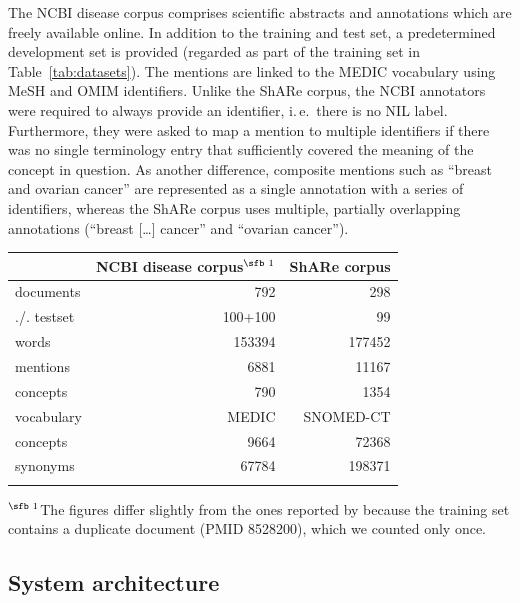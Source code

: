 \documentclass{bioinfo}
\newcommand{\ie}{i.\,e.\ }
\begin{document}
The NCBI disease corpus comprises scientific abstracts and annotations which are freely available online.
In addition to the training and test set, a predetermined development set is provided (regarded as part of the training set in Table~\ref{tab:datasets}).
The mentions are linked to the MEDIC vocabulary \citep{davis-et-al:2012}
using MeSH  %
and OMIM  %
identifiers.
Unlike the ShARe corpus, the NCBI annotators were required to always provide an identifier, \ie there is no NIL label.
Furthermore, they were asked to map a mention to multiple identifiers if there was no single terminology entry that sufficiently covered the meaning of the concept in question.
As another difference, composite mentions such as “breast and ovarian cancer” are represented as a single annotation with a series of identifiers, whereas the ShARe corpus uses multiple, partially overlapping annotations (“breast [\dots] cancer” and “ovarian cancer”).

\begin{table}[!t]
{\begin{tabular}{@{}lrr@{}}\toprule
              & NCBI disease corpus$^\text{\sfb 1}$ & ShARe corpus\\\midrule
  documents   & 792     & 298\\
  ./. testset & 100+100 & 99\\
  words       & 153394  & 177452\\
  mentions    & 6881    & 11167\\
  concepts    & 790     & 1354\\
  \midrule
  vocabulary  & MEDIC   & SNOMED-CT\\
  concepts    & 9664    & 72368\\
  synonyms    & 67784   & 198371\\
  \botrule
\end{tabular}}{$^\text{\sfb 1}$The figures differ slightly from the ones reported by \cite{islamaj-dogan-et-al:2014} because the training set contains a duplicate document (PMID 8528200), which we counted only once.}
\end{table}



\subsection{System architecture}
\end{document}
